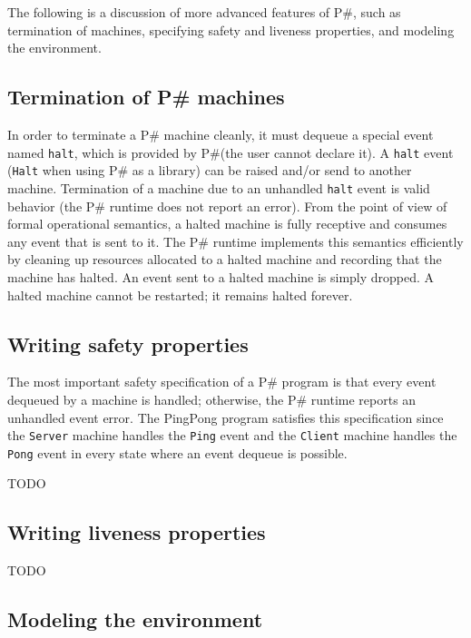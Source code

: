 \documentclass{llncs}
\newcommand{\ps}{P\#\xspace}
\begin{document}
The following is a discussion of more advanced features of \ps, such as termination of machines, specifying safety and liveness properties, and modeling the environment.

\subsection{Termination of \ps machines}
\label{sec:termination}

In order to terminate a \ps machine cleanly, it must dequeue a special event named \texttt{halt}, which is provided by \ps (the user cannot declare it). A \texttt{halt} event (\texttt{Halt} when using \ps as a library) can be raised and/or send to another machine. Termination of a machine due to an unhandled \texttt{halt} event is valid behavior (the \ps runtime does not report an error). From the point of view of formal operational semantics, a halted machine is fully receptive and consumes any event that is sent to it. The \ps runtime implements this semantics efficiently by cleaning up resources allocated to a halted machine and recording that the machine has halted. An event sent to a halted machine is simply dropped. A halted machine cannot be restarted; it remains halted forever.

\subsection{Writing safety properties}
\label{sec:safety}

The most important safety specification of a \ps program is that every event dequeued by a machine is handled; otherwise, the \ps runtime reports an unhandled event error. The PingPong program satisfies this specification since the \texttt{Server} machine handles the \texttt{Ping} event and the \texttt{Client} machine handles the \texttt{Pong} event in every state where an event dequeue is possible.

TODO

\subsection{Writing liveness properties}
\label{sec:liveness}

TODO

\subsection{Modeling the environment}
\label{sec:modeling}
\end{document}
